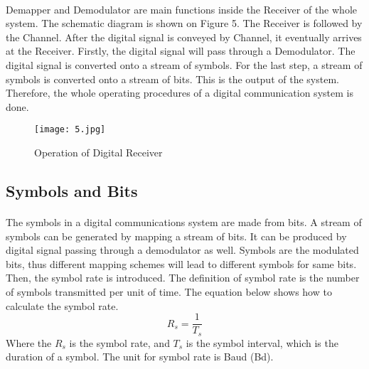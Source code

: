 \documentclass[12pt]{article}
\begin{document}
    \paragraph{}
    Demapper and Demodulator are main functions inside the Receiver of the whole system. The schematic diagram is shown on Figure 5. The Receiver is followed by the Channel. After the digital signal is conveyed by Channel, it eventually arrives at the Receiver. Firstly, the digital signal will pass through a Demodulator. The digital signal is converted onto a stream of symbols. For the last step, a stream of symbols is converted onto a stream of bits. This is the output of the system. Therefore, the whole operating procedures of a digital communication system is done.
    \begin{figure}[H]
    \centering
    \texttt{[image: 5.jpg]}
    \caption{Operation of Digital Receiver}
    \end{figure}
    
    
    
    \subsection{Symbols and Bits}
    \paragraph{}
    The symbols in a digital communications system are made from bits. A stream of symbols can be generated by mapping a stream of bits. It can be produced by digital signal passing through a demodulator as well. Symbols are the modulated bits, thus different mapping schemes will lead to different symbols for same bits. Then, the symbol rate is introduced. The definition of symbol rate is the number of symbols transmitted  per unit of time. The equation below shows how to calculate the symbol rate\cite{3}.
    \begin{equation}
        R_s=\frac{1}{T_s}
    \end{equation}
     Where the $R_s$ is the symbol rate, and $T_s$ is the symbol interval, which is the duration of a symbol. The unit for symbol rate is Baud (Bd).
    
\end{document}
